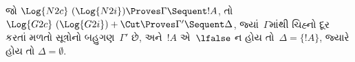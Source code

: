 \begingroup
\makeatletter{}\makeatother


\label{guunit:OLP-0671}


\begin{prop}
જો $\Log{N2c}\ (\Log{N2i}) \Proves
\Gamma \Sequent !A$,
તો~$\Log{G2c}\ (\Log{G2i}) + \Cut \Proves \Gamma'
\Sequent \Delta$,
જ્યાં~$\Gamma$માંથી
ચિહ્નો દૂર કરતાં
મળતો સૂત્રોનો
બહુગણ~$\Gamma'$ છે,
અને~$!A$ એ~$\lfalse$
ન હોય તો~$\Delta = \{!A\}$,
જ્યારે હોય તો
$\Delta = \emptyset$.
\end{prop}

